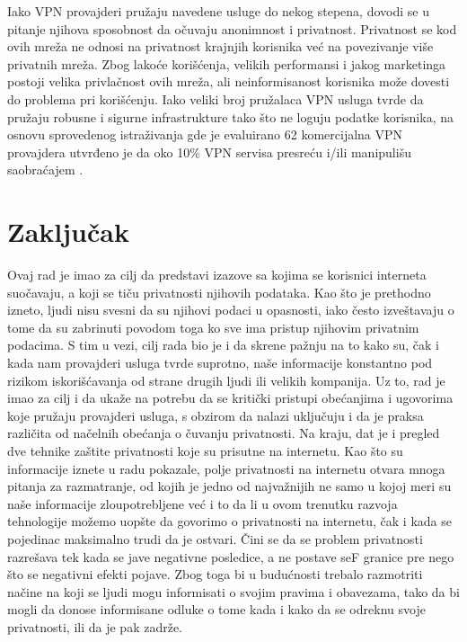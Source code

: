 \documentclass[a4paper]{article}
\begin{document}
\par Iako VPN provajderi pružaju navedene usluge do nekog stepena, dovodi se u pitanje njihova sposobnost da očuvaju anonimnost i privatnost. Privatnost se kod ovih mreža ne odnosi na privatnost krajnjih korisnika već na povezivanje više privatnih mreža. Zbog lakoće korišćenja, velikih performansi i jakog marketinga postoji velika privlačnost ovih mreža, ali neinformisanost korisnika može dovesti do problema pri korišćenju. Iako veliki broj pružalaca VPN usluga  tvrde da pružaju robusne i sigurne infrastrukture tako što ne loguju podatke korisnika, na osnovu sprovedenog istraživanja gde je evaluirano 62 komercijalna VPN provajdera utvrđeno je da oko 10\% VPN servisa presreću i/ili manipulišu saobraćajem \cite{vpn6}.

 
\section{Zaključak}
\label{sec:zakljucak}
Ovaj rad je imao za cilj da predstavi izazove sa kojima se korisnici interneta suočavaju, a koji se tiču privatnosti njihovih podataka. Kao što je prethodno izneto, ljudi nisu svesni da su njihovi podaci u opasnosti, iako često izveštavaju o tome da su zabrinuti povodom toga ko sve ima pristup njihovim privatnim podacima. S tim u vezi, cilj rada bio je i da skrene pažnju na to kako su, čak i kada nam provajderi usluga tvrde suprotno, naše informacije konstantno pod rizikom iskorišćavanja od strane drugih ljudi ili velikih kompanija. Uz to, rad je imao za cilj i da ukaže na potrebu da se kritički pristupi obećanjima i ugovorima koje pružaju provajderi usluga, s obzirom da nalazi uključuju i da je praksa različita od načelnih obećanja o čuvanju privatnosti. Na kraju, dat je i pregled dve tehnike zaštite privatnosti koje su prisutne na internetu. Kao što su informacije iznete u radu pokazale, polje privatnosti na internetu otvara mnoga pitanja za razmatranje, od kojih je jedno od najvažnijih ne samo u kojoj meri su naše informacije zloupotrebljene već i to da li u ovom trenutku razvoja tehnologije možemo uopšte da govorimo o privatnosti na internetu, čak i kada se pojedinac maksimalno trudi da je ostvari. Čini se da se problem privatnosti razrešava tek kada se jave negativne posledice, a ne postave seF granice pre nego što se negativni efekti pojave. Zbog toga bi u budućnosti trebalo razmotriti načine na koji se ljudi mogu informisati o svojim pravima i obavezama, tako da bi mogli da donose informisane odluke o tome kada i kako da se odreknu svoje privatnosti, ili da je pak zadrže.

 

\end{document}

